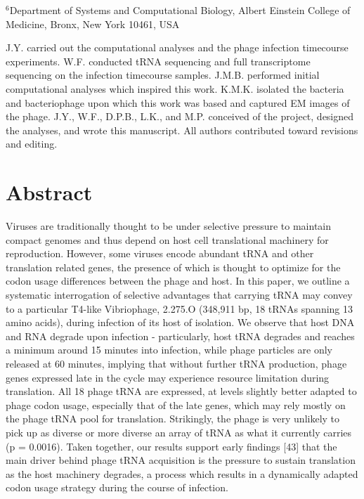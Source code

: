 \documentclass[12pt,twoside]{mitthesis-manusdown}
\begin{document}
\noindent \(^6\)Department of Systems and Computational Biology, Albert
Einstein College of Medicine, Bronx, New York 10461, USA \newline

\noindent J.Y. carried out the computational analyses and the phage
infection timecourse experiments. W.F. conducted tRNA sequencing and
full transcriptome sequencing on the infection timecourse samples.
J.M.B. performed initial computational analyses which inspired this
work. K.M.K. isolated the bacteria and bacteriophage upon which this
work was based and captured EM images of the phage. J.Y., W.F., D.P.B.,
L.K., and M.P. conceived of the project, designed the analyses, and
wrote this manuscript. All authors contributed toward revisions and
editing.

\doublespace
\newpage

\section{Abstract}\label{abstract}

Viruses are traditionally thought to be under selective pressure to
maintain compact genomes and thus depend on host cell translational
machinery for reproduction. However, some viruses encode abundant tRNA
and other translation related genes, the presence of which is thought to
optimize for the codon usage differences between the phage and host. In
this paper, we outline a systematic interrogation of selective
advantages that carrying tRNA may convey to a particular T4-like
Vibriophage, 2.275.O (348,911 bp, 18 tRNAs spanning 13 amino acids),
during infection of its host of isolation. We observe that host DNA and
RNA degrade upon infection - particularly, host tRNA degrades and
reaches a minimum around 15 minutes into infection, while phage
particles are only released at 60 minutes, implying that without further
tRNA production, phage genes expressed late in the cycle may experience
resource limitation during translation. All 18 phage tRNA are expressed,
at levels slightly better adapted to phage codon usage, especially that
of the late genes, which may rely mostly on the phage tRNA pool for
translation. Strikingly, the phage is very unlikely to pick up as
diverse or more diverse an array of tRNA as what it currently carries (p
= 0.0016). Taken together, our results support early findings {[}43{]}
that the main driver behind phage tRNA acquisition is the pressure to
sustain translation as the host machinery degrades, a process which
results in a dynamically adapted codon usage strategy during the course
of infection.
\end{document}
